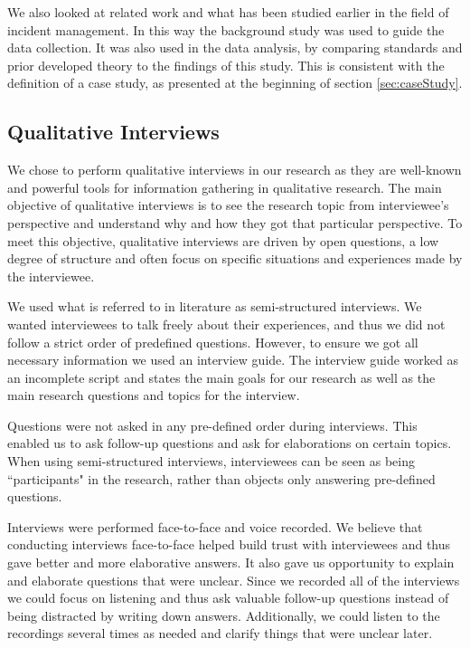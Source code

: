 We also looked at related work and what has been studied earlier in the field of incident management. In this way the background study was used to guide the data collection. It was also used in the data analysis, by comparing standards and prior developed theory to the findings of this study. This is consistent with the definition of a case study, as presented at the beginning of section \ref{sec:caseStudy}.

\subsection{Qualitative Interviews}
\label{sec:interviews}
We chose to perform qualitative interviews in our research as they are well-known and powerful tools for information gathering in qualitative research\cite{myers2007qualitative}. The main objective of qualitative interviews is to see the research topic from interviewee's perspective and understand why and how they got that particular perspective\cite{cassell2004essential}. To meet this objective, qualitative interviews are driven by open questions, a low degree of structure and often focus on specific situations and experiences made by the interviewee. 

We used what is referred to in literature as semi-structured interviews\cite{cassell2004essential}. We wanted interviewees to talk freely about their experiences, and thus we did not follow a strict order of predefined questions. However, to ensure we got all necessary information we used an interview guide. The interview guide worked as an incomplete script and states the main goals for our research as well as the main research questions and topics for the interview.

Questions were not asked in any pre-defined order during interviews. This enabled us to ask follow-up questions and ask for elaborations on certain topics. When using semi-structured interviews, interviewees can be seen as being ``participants" in the research, rather than objects only answering pre-defined questions.

Interviews were performed face-to-face and voice recorded. We believe that conducting interviews face-to-face helped build trust with interviewees and thus gave better and more elaborative answers. It also gave us opportunity to explain and elaborate questions that were unclear. Since we recorded all of the interviews we could focus on listening and thus ask valuable follow-up questions instead of being distracted by writing down answers. Additionally, we could listen to the recordings several times as needed and clarify things that were unclear later.

